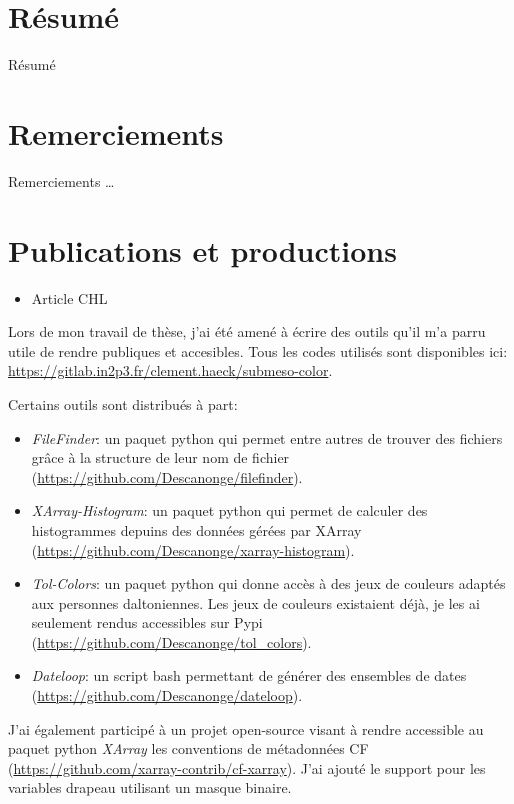 \frontmatter

\section{Résumé}
Résumé

\clearpage
\section*{Remerciements}
Remerciements \dots

\clearpage
\section{Publications et productions}

\begin{itemize}
        \item Article CHL
\end{itemize}
\medskip

Lors de mon travail de thèse, j'ai été amené à écrire des outils qu'il m'a parru utile de rendre publiques et accesibles. Tous les codes utilisés sont disponibles ici: \url{https://gitlab.in2p3.fr/clement.haeck/submeso-color}.
\medskip

Certains outils sont distribués à part:
\begin{itemize}
  \item \emph{FileFinder}: un paquet python qui permet entre autres de trouver des fichiers grâce à la structure de leur nom de fichier (\url{https://github.com/Descanonge/filefinder}).
  \item \emph{XArray-Histogram}: un paquet python qui permet de calculer des histogrammes depuins des données gérées par XArray (\url{https://github.com/Descanonge/xarray-histogram}).
  \item \emph{Tol-Colors}: un paquet python qui donne accès à des jeux de couleurs adaptés aux personnes daltoniennes. Les jeux de couleurs existaient déjà, je les ai seulement rendus accessibles sur Pypi (\url{https://github.com/Descanonge/tol_colors}).
  \item \emph{Dateloop}: un script bash permettant de générer des ensembles de dates (\url{https://github.com/Descanonge/dateloop}).
\end{itemize}
\medskip

J'ai également participé à un projet open-source visant à rendre accessible au paquet python \emph{XArray} les conventions de métadonnées CF (\url{https://github.com/xarray-contrib/cf-xarray}).
J'ai ajouté le support pour les variables drapeau utilisant un masque binaire.
